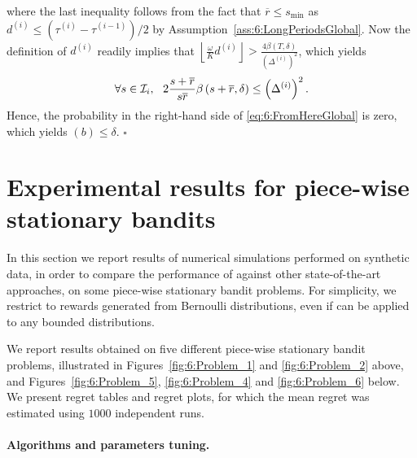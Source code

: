 %
where the last inequality follows from the fact that $\overline{r} \leq s_{\min}$ as $d^{(i)} \leq (\tau^{(i)} - \tau^{(i-1)})/2$ by Assumption~\ref{ass:6:LongPeriodsGlobal}. Now the definition of $d^{(i)}$ readily implies that
$\left\lfloor \frac{\omega}{K}d^{(i)}\right\rfloor > \frac{4\beta(T,\delta)}{\left(\Delta^{(i)}\right)^2}$,
which yields
\[\forall s \in \cI_{i}, \ \ 2\frac{s+\overline{r}}{s\overline{r}}\beta\left(s+\overline{r}, \delta\right) \leq \left(\Delta^{(i)}\right)^2.\]
%
Hence, the probability in the right-hand side of \eqref{eq:6:FromHereGlobal} is zero, which yields $(b) \leq \delta$.
%
\hfill{}$\square$





\section{Experimental results for piece-wise stationary bandits}
\label{sec:6:NumericalExperiments}

In this section we report results of numerical simulations performed on synthetic data, in order to compare the performance of \GLRklUCB{} against other state-of-the-art approaches, on some piece-wise stationary bandit problems.
%
For simplicity, we restrict to rewards generated from Bernoulli distributions, even if \GLRklUCB{} can be applied to any bounded distributions.


We report results obtained on five different piece-wise stationary bandit problems, illustrated in Figures~\ref{fig:6:Problem_1} and \ref{fig:6:Problem_2} above, and Figures~\ref{fig:6:Problem_5}, \ref{fig:6:Problem_4} and \ref{fig:6:Problem_6} below.
We present regret tables and regret plots,
for which the mean regret was estimated using $1000$ independent runs.


\paragraph{Algorithms and parameters tuning.}
\label{sub:6:ParametersTuning}

